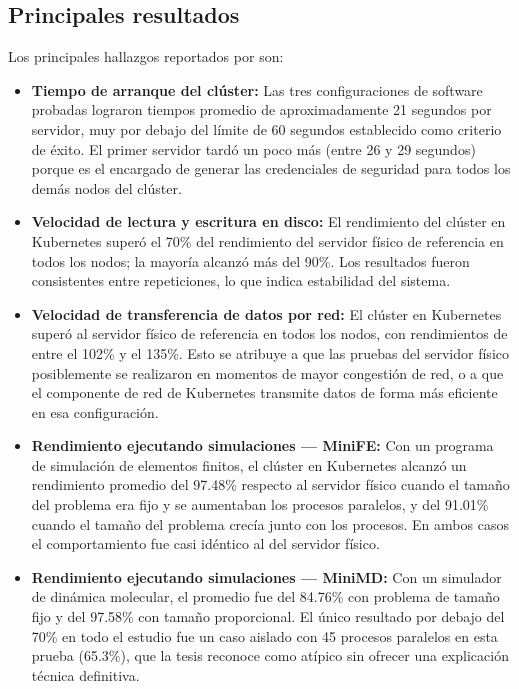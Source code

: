 \subsection{Principales resultados}

Los principales hallazgos reportados por \cite{arias2024} son:

\begin{itemize}
    \item \textbf{Tiempo de arranque del clúster:} Las tres configuraciones de software probadas lograron tiempos promedio de aproximadamente 21 segundos por servidor, muy por debajo del límite de 60 segundos establecido como criterio de éxito. El primer servidor tardó un poco más (entre 26 y 29 segundos) porque es el encargado de generar las credenciales de seguridad para todos los demás nodos del clúster.

    \item \textbf{Velocidad de lectura y escritura en disco:} El rendimiento del clúster en Kubernetes superó el 70\% del rendimiento del servidor físico de referencia en todos los nodos; la mayoría alcanzó más del 90\%. Los resultados fueron consistentes entre repeticiones, lo que indica estabilidad del sistema.

    \item \textbf{Velocidad de transferencia de datos por red:} El clúster en Kubernetes superó al servidor físico de referencia en todos los nodos, con rendimientos de entre el 102\% y el 135\%. Esto se atribuye a que las pruebas del servidor físico posiblemente se realizaron en momentos de mayor congestión de red, o a que el componente de red de Kubernetes transmite datos de forma más eficiente en esa configuración.

    \item \textbf{Rendimiento ejecutando simulaciones --- MiniFE:} Con un programa de simulación de elementos finitos, el clúster en Kubernetes alcanzó un rendimiento promedio del 97.48\% respecto al servidor físico cuando el tamaño del problema era fijo y se aumentaban los procesos paralelos, y del 91.01\% cuando el tamaño del problema crecía junto con los procesos. En ambos casos el comportamiento fue casi idéntico al del servidor físico.

    \item \textbf{Rendimiento ejecutando simulaciones --- MiniMD:} Con un simulador de dinámica molecular, el promedio fue del 84.76\% con problema de tamaño fijo y del 97.58\% con tamaño proporcional. El único resultado por debajo del 70\% en todo el estudio fue un caso aislado con 45 procesos paralelos en esta prueba (65.3\%), que la tesis reconoce como atípico sin ofrecer una explicación técnica definitiva.
\end{itemize}

